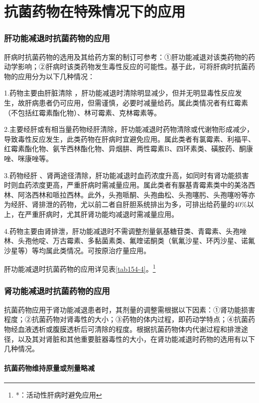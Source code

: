 \protect\hypertarget{text00434.html}{}{}

\section{抗菌药物在特殊情况下的应用}

\subsubsection{肝功能减退时抗菌药物的应用}

肝病时抗菌药物的选用及其给药方案的制订可参考：①肝功能减退对该类药物的药动学影响；②肝病时该类药物发生毒性反应的可能性。基于此，可将肝病时抗菌药物的应用分为以下几种情况：

1.药物主要由肝脏清除
，肝功能减退时清除明显减少，但并无明显毒性反应发生，故肝病患者仍可应用，但需谨慎，必要时减量给药。属此类情况者有红霉素（不包括红霉素酯化物）、林可霉素、克林霉素等。

2.主要经肝或有相当量药物经肝清除，肝功能减退时药物清除或代谢物形成减少，导致毒性反应发生，此类药物在肝病时宜避免应用。属此类者有氯霉素、利福平、红霉素酯化物、氨苄西林酯化物、异烟肼、两性霉素B、四环素类、磺胺药、酮康唑、咪康唑等。

3.药物经肝
、肾两途径清除，肝功能减退时血药浓度升高，如同时有肾功能损害时则血药浓度更高，严重肝病时需减量应用。属此类者有脲基青霉素类中的美洛西林、阿洛西林和哌拉西林。此外，头孢哌酮、头孢曲松、头孢噻肟、头孢噻吩等亦为经肝、肾排泄的药物，尤以前二者自肝胆系统排出为多，可排出给药量的40\%以上，在严重肝病时，尤其肝肾功能均减退时需减量应用。

4.药物主要由肾排泄，肝功能减退时不需调整剂量氨基糖苷类、青霉素、头孢唑林、头孢他啶、万古霉素、多黏菌素类、氟喹诺酮类（氧氟沙星、环丙沙星、诺氟沙星等）等均属此类情况。可按原治疗量应用。

肝功能减退时抗菌药物的应用详见表\ref{tab154-4}。\footnote{*：活动性肝病时避免应用}

\subsubsection{肾功能减退时抗菌药物的应用}

抗菌药物应用于肾功能减退患者时，其剂量的调整需根据以下因素：①肾功能损害程度；②抗菌药物对肾毒性的大小；③药物的体内过程，即药动学特点；④抗菌药物经血液透析或腹膜透析后可清除的程度。根据抗菌药物体内代谢过程和排泄途径，以及其对肾脏和其他重要脏器毒性的大小，在肾功能减退时药物的选用有以下几种情况。

\paragraph{抗菌药物维持原量或剂量略减}

